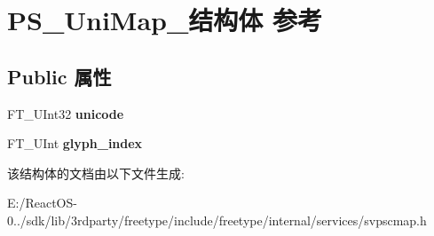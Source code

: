 \hypertarget{struct_p_s___uni_map__}{}\section{P\+S\+\_\+\+Uni\+Map\+\_\+结构体 参考}
\label{struct_p_s___uni_map__}
\subsection*{Public 属性}
\begin{DoxyCompactItemize}
\item 
\mbox{\label{struct_p_s___uni_map___a87c1f471eb4033fc5ed9d0f1ecaf35a1}} 
F\+T\+\_\+\+U\+Int32 {\bfseries unicode}
\item 
\mbox{\label{struct_p_s___uni_map___a0d5b2e3c405aeab1f1059a3587125cfd}} 
F\+T\+\_\+\+U\+Int {\bfseries glyph\+\_\+index}
\end{DoxyCompactItemize}


该结构体的文档由以下文件生成\+:\begin{DoxyCompactItemize}
\item 
E\+:/\+React\+O\+S-\/0../sdk/lib/3rdparty/freetype/include/freetype/internal/services/svpscmap.\+h\end{DoxyCompactItemize}
